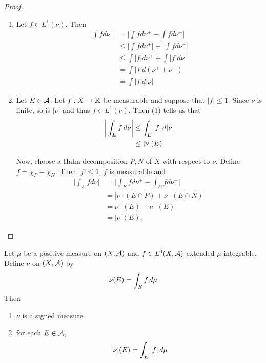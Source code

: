 \documentclass{book}
\begin{document}
	\begin{proof}
		\begin{enumerate}
			\item Let $f \in L^1(\nu)$. Then 
			\begin{align*}
				\bigg|\int f d \nu \bigg| 
				&= \bigg|\int f d \nu^+ - \int f d \nu^-\bigg|\\
				& \leq \bigg|\int f d \nu^+\bigg| + \bigg|\int f d \nu^-\bigg|\\
				& \leq \int |f| d\nu^+ + \int |f| d\nu^-\\
				&= \int |f| d (\nu^+ + \nu^-)\\
				&= \int |f| d |\nu|
			\end{align*}
			
			\item Let $E \in \mathcal{A}$. Let $f:X \rightarrow \mathbb{R}$ be measurable and suppose that $|f| \leq 1$. Since $\nu$ is finite, so is $|\nu|$ and thus $f \in L^1(\nu)$. Then (1) tells us that 
			\begin{align*}
				\bigg |\int_E f \, d \nu \bigg| 
				& \leq \int_E |f| \, d |\nu|\\
				& \leq |\nu|(E) 
			\end{align*}
			
			Now, choose a Hahn decomposition $P,N$ of $X$ with respect to $\nu$. Define $f = \chi_{P} - \chi_{N}$. Then $|f| \leq 1$, $f$ is measurable and 
			\begin{align*}
				\bigg|\int_E f d\nu\bigg|
				&= \bigg|\int_E f d \nu^+ - \int_E f d \nu^-\bigg|\\
				&= | \nu^+(E \cap P) + \nu^-(E \cap N)|\\
				&= \nu^+(E) + \nu^-(E)\\
				&= |\nu|(E).
			\end{align*}
			
		\end{enumerate}
	\end{proof}
	
	\begin{ex}  
		Let $\mu$ be a positive measure on $(X, \mathcal{A})$ and $f \in L^0(X, \mathcal{A})$ extended $\mu$-integrable. Define $\nu$ on $(X, \mathcal{A})$ by $$\nu(E) = \int_E f \, d \mu$$ Then
		\begin{enumerate}
			\item $\nu$ is a signed measure
			\item for each $E\in \mathcal{A}$, $$|\nu|(E) = \int_E|f|\, d \mu$$
		\end{enumerate} 
	\end{ex}
	
\end{document}
